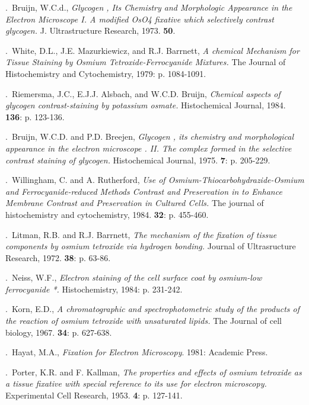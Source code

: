 \documentclass{article}
\begin{document}
.\ Bruijn, W.C.d., \emph{Glycogen , Its Chemistry and Morphologic Appearance in the Electron  Microscope I. A modified OsO4 fixative which selectively contrast glycogen.} J. Ultrastructure Research, 1973. \textbf{50}.\par
{}.\ White, D.L., J.E. Mazurkiewicz, and R.J. Barrnett, \emph{A chemical Mechanism for Tissue  Staining by Osmium Tetroxide-Ferrocyanide Mixtures.} The Journal of Histochemistry and Cytochemistry, 1979: p. 1084-1091.\par
{}.\ Riemersma, J.C., E.J.J. Alsbach, and W.C.D. Bruijn, \emph{Chemical aspects of glycogen  contrast-staining by potassium osmate.} Histochemical Journal, 1984. \textbf{136}: p. 123-136.\par
{}.\ Bruijn, W.C.D. and P.D. Breejen, \emph{Glycogen , its chemistry and morphological  appearance in the electron microscope . II. The complex formed in the selective contrast  staining of glycogen.} Histochemical Journal, 1975. \textbf{7}: p. 205-229.\par
{}
.\ Willingham, C. and A. Rutherford, \emph{Use of Osmium-Thiocarbohydrazide-Osmium and  Ferrocyanide-reduced Methods Contrast and Preservation in to Enhance Membrane  Contrast and Preservation in Cultured Cells.} The journal of histochemistry and cytochemistry, 1984. \textbf{32}: p. 455-460.\par
{}.\ Litman, R.B. and R.J. Barrnett, \emph{The mechanism of the fixation of tissue components by  osmium tetroxide via hydrogen bonding.} Journal of Ultrasructure Research, 1972. \textbf{38}: p. 63-86.\par
{}.\ Neiss, W.F., \emph{Electron staining of the cell surface coat by osmium-low ferrocyanide *.} Histochemistry, 1984: p. 231-242.\par
{}.\ Korn, E.D., \emph{A chromatographic and spectrophotometric study of the products of the  reaction of osmium tetroxide with unsaturated lipids.} The Journal of cell biology, 1967. \textbf{34}: p. 627-638.\par
{}.\ Hayat, M.A., \emph{Fixation for Electron Microscopy}. 1981: Academic Press.\par
{}.\ Porter, K.R. and F. Kallman, \emph{The properties and effects of osmium tetroxide as a tissue  fixative with special reference to its use for electron microscopy.} Experimental Cell Research, 1953. \textbf{4}: p. 127-141.\par
\end{document}
